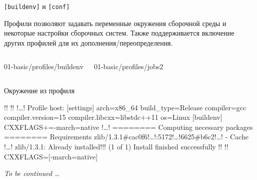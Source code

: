 \documentclass[compress, 8pt, aspectratio=169]{beamer}
\newcommand{\excl}{!}
\begin{document}
\begin{frame}[fragile]{\texttt{[buildenv]} и \texttt{[conf]}}

  Профили позволяют задавать переменные окружения сборочной среды и некоторые
  настройки сборочных систем.
  Также поддерживается включение других профилей для их
  дополнения/переопределения.

  \begin{columns}[T]


      {01-basic/profiles/buildenv}


      {01-basic/profiles/jobs2}

  \end{columns}

\end{frame}

\begin{frame}[fragile]{Окружение из профиля}

  {\small
  \begin{terminalwindow}[!!][minted options={escapeinside=!!, lastline=15}]
!!
!!
!\dots!
Profile host:
[settings]
arch=x86_64
build_type=Release
compiler=gcc
compiler.version=15
compiler.libcxx=libstdc++11
os=Linux
[buildenv]
CXXFLAGS+=-march=native
!\dots!
======== Computing necessary packages ========
Requirements
    zlib/1.3.1#cac0f6!\dots!:5172!\dots!6625#b6c2!\dots! - Cache
!\dots!
zlib/1.3.1: Already installed!\excl! (1 of 1)
Install finished successfully
!!
!!
CXXFLAGS=[-march=native]
  \end{terminalwindow}
  }

  \textit{To be continued \dots}

\end{frame}
\end{document}
